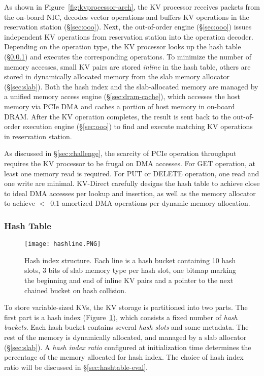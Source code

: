 As shown in Figure~\ref{fig:kvprocessor-arch}, the KV processor receives packets from the on-board NIC, decodes vector operations and buffers KV operations in the reservation station (\S\ref{sec:ooo}).
Next, the out-of-order engine (\S\ref{sec:ooo}) issues independent KV operations from reservation station into the operation decoder.
Depending on the operation type, the KV processor looks up the hash table (\S\ref{sec:hashtable}) and executes the corresponding operations.
To minimize the number of memory accesses, small KV pairs are stored \textit{inline} in the hash table, others are stored in dynamically allocated memory from the slab memory allocator (\S\ref{sec:slab}).
Both the hash index and the slab-allocated memory are managed by a unified memory access engine (\S\ref{sec:dram-cache}), which accesses the host memory via PCIe DMA and caches a portion of host memory in on-board DRAM.
After the KV operation completes, the result is sent back to the out-of-order execution engine (\S\ref{sec:ooo}) to find and execute matching KV operations in reservation station.

As discussed in \S\ref{sec:challenge}, the scarcity of PCIe operation throughput requires the KV processor to be frugal on DMA accesses.
For GET operation, at least one memory read is required.
For PUT or DELETE operation, one read and one write are minimal.
KV-Direct carefully designs the hash table to achieve close to ideal DMA accesses per lookup and insertion, as well as the memory allocator to achieve $<$~0.1 amortized DMA operations per dynamic memory allocation.

\subsubsection{Hash Table}
\label{sec:hashtable}

\begin{figure}[t]
\centering
\texttt{[image: hashline.PNG]}
\caption{Hash index structure. Each line is a hash bucket containing 10 hash slots, 3 bits of slab memory type per hash slot, one bitmap marking the beginning and end of inline KV pairs and a pointer to the next chained bucket on hash collision.}
\label{fig:hashtable}
\vspace{-10pt}
\end{figure}

To store variable-sized KVs, the KV storage is partitioned into two parts. The first part is a hash index (Figure~\ref{fig:hashtable}), which consists a fixed number of \textit{hash buckets}. Each hash bucket contains several \textit{hash slots} and some metadata. The rest of the memory is dynamically allocated, and managed by a slab allocator (\S\ref{sec:slab}).
A \textit{hash index ratio} configured at initialization time determines the percentage of the memory allocated for hash index.
The choice of hash index ratio will be discussed in \S\ref{sec:hashtable-eval}.

